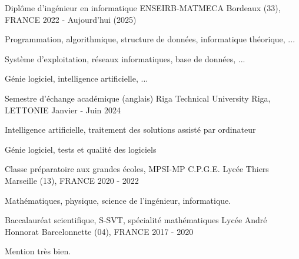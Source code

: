 

\begin{cventries}

  \cventry
    {Diplôme d'ingénieur en informatique} %
    {ENSEIRB-MATMECA} %
    {Bordeaux (33), FRANCE} %
    {2022 - Aujourd'hui (2025)} %
    {
      \begin{cvitems} %
        \item{Programmation, algorithmique, structure de données, informatique théorique, ...}
        \item{Système d'exploitation, réseaux informatiques, base de données, ...}
        \item{Génie logiciel, intelligence artificielle, ...}
      \end{cvitems}
    }

  \cventry
    {Semestre d'échange académique (anglais)} %
    {Riga Technical University} %
    {Riga, LETTONIE} %
    {Janvier - Juin 2024} %
    {
      \begin{cvitems} %
        \item{Intelligence artificielle, traitement des solutions assisté par ordinateur}
        \item{Génie logiciel, tests et qualité des logiciels}
      \end{cvitems}
    }

  \cventry
    {Classe préparatoire aux grandes écoles, MPSI-MP} %
    {C.P.G.E. Lycée Thiers} %
    {Marseille (13), FRANCE} %
    {2020 - 2022} %
    {
      \begin{cvitems} %
        \item{Mathématiques, physique, science de l'ingénieur, informatique.}
      \end{cvitems}
    }

  \cventry
    {Baccalauréat scientifique, S-SVT, spécialité mathématiques} %
    {Lycée André Honnorat} %
    {Barcelonnette (04), FRANCE} %
    {2017 - 2020} %
    {
      \begin{cvitems} %
        \item{Mention très bien.}
      \end{cvitems}
    }


\end{cventries}
